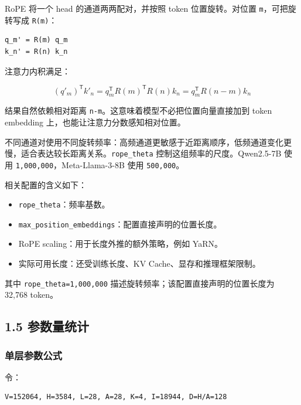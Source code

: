 \documentclass[UTF8,fontset=fandol,a4paper,11pt]{ctexart}
\providecommand{\tightlist}{\setlength{\itemsep}{0pt}\setlength{\parskip}{0pt}}
\begin{document}
RoPE 将一个 head 的通道两两配对，并按照 token 位置旋转。对位置
\nolinkurl{m}，可把旋转写成 \nolinkurl{R(m)}：

\begin{Verbatim}[breaklines,breakanywhere,fontsize=\small]
q_m' = R(m) q_m
k_n' = R(n) k_n
\end{Verbatim}

注意力内积满足：

\[
(q'_m)^{\mathsf{T}} k'_n = q_m^{\mathsf{T}} R(m)^{\mathsf{T}}R(n) k_n = q_m^{\mathsf{T}}R(n-m)k_n
\]

结果自然依赖相对距离 \nolinkurl{n-m}。这意味着模型不必把位置向量直接加到
token embedding 上，也能让注意力分数感知相对位置。

不同通道对使用不同旋转频率：高频通道更敏感于近距离顺序，低频通道变化更慢，适合表达较长距离关系。\nolinkurl{rope_theta}
控制这组频率的尺度。Qwen2.5-7B 使用
\nolinkurl{1,000,000}，Meta-Llama-3-8B 使用 \nolinkurl{500,000}。

相关配置的含义如下：

\begin{itemize}
\tightlist
\item
  \nolinkurl{rope_theta}：频率基数。
\item
  \nolinkurl{max_position_embeddings}：配置直接声明的位置长度。
\item
  RoPE scaling：用于长度外推的额外策略，例如 YaRN。
\item
  实际可用长度：还受训练长度、KV Cache、显存和推理框架限制。
\end{itemize}

其中 \nolinkurl{rope_theta=1,000,000}
描述旋转频率；该配置直接声明的位置长度为 32,768 token。

\subsection{1.5 参数量统计}\label{ux53c2ux6570ux91cfux7edfux8ba1}

\subsubsection{单层参数公式}\label{ux5355ux5c42ux53c2ux6570ux516cux5f0f}

令：

\begin{Verbatim}[breaklines,breakanywhere,fontsize=\small]
V=152064, H=3584, L=28, A=28, K=4, I=18944, D=H/A=128
\end{Verbatim}
\end{document}

